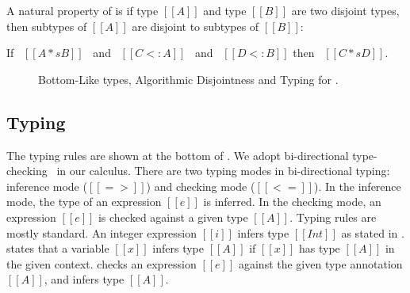 
\begin{comment}
\begin{lemma}[Bottom-Like Disjoint]
  If \ $[[botlike A]]$ \ then \ $[[A * B]]$.
\label{lemma:union:bl-disjoint}
\end{lemma}
\end{comment}

\noindent A natural property of \cal is
if type $[[A]]$ and type $[[B]]$ are two disjoint types, then subtypes
of $[[A]]$ are disjoint to subtypes of $[[B]]$:

\begin{lemma}
  If \ $[[A *s B]]$ \ and \ $[[C <: A]]$ \ and \ $[[D <: B]]$  then \ $[[C *s D]]$.
\label{lemma:union:disj-sub}
\end{lemma}



\begin{figure}[t]
  \begin{small}
    \centering
  \end{small}
  \begin{small}
    \centering
  \end{small}
  \begin{small}
    \centering
  \end{small}
  \caption{Bottom-Like types, Algorithmic Disjointness and Typing for \cal.}
  \label{fig:union:disj-typ}
\end{figure}


\subsection{Typing}
\label{sec:union:typ}
The typing rules are shown at the bottom of .
We adopt bi-directional type-checking~\cite{pierce2000local} in our calculus.  There
are two typing modes in bi-directional typing: inference mode
($[[=>]]$) and checking mode ($[[<=]]$). In the inference mode, the type of
an expression $[[e]]$ is inferred.  In the checking
mode, an expression $[[e]]$ is checked against a given type $[[A]]$.
Typing rules are mostly standard. An integer
expression $[[i]]$ infers type $[[Int]]$ as stated in .
 states that a variable $[[x]]$ infers type $[[A]]$ if
$[[x]]$ has type $[[A]]$ in the given context. 
checks an expression $[[e]]$ against the given type annotation $[[A]]$,
and infers type $[[A]]$.

